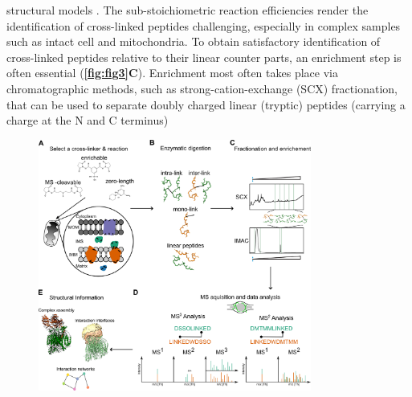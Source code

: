 structural models \cite{Sinnott_2020}. The sub-stoichiometric reaction efficiencies render the identification of cross-linked peptides challenging, especially in complex samples such as intact cell and mitochondria. To obtain satisfactory identification of cross-linked peptides relative to their linear counter parts, an enrichment step is often essential (\textbf{\autoref{fig:fig3}C}). Enrichment most often takes place via chromatographic methods, such as strong-cation-exchange (SCX) fractionation, that can be used to separate doubly charged linear (tryptic) peptides (carrying a charge at the N and C terminus)

\begin{figure}[hbt!]
\center
\includegraphics[width=0.8\textwidth]{Chapter.1/Figures/Figure3.png} 

\end{figure}
